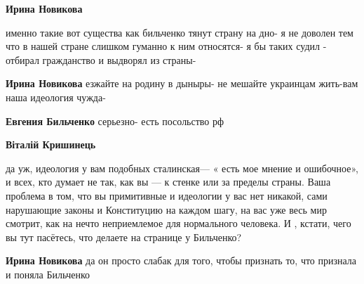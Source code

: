 \begin{itemize}
\begin{itemize}
 
\textbf{Ирина Новикова} 

именно такие вот существа как бильченко тянут страну на дно- я не доволен тем
что в нашей стране слишком гуманно к ним относятся- я бы таких судил - отбирал
гражданство и выдворял из страны-

 
\textbf{Ирина Новикова} езжайте на родину в дыныры- не мешайте украинцам жить-вам наша идеология чужда-

 
\textbf{Евгения Бильченко} серьезно- есть посольство рф

 
\textbf{Віталій Кришинець} 

да уж, идеология у вам подобных сталинская— « есть мое мнение и ошибочное», и
всех, кто думает не так, как вы — к стенке или за пределы страны. Ваша проблема
в том, что вы примитивные и идеологии у вас нет никакой, сами нарушающие законы
и Конституцию на каждом шагу, на вас уже весь мир смотрит, как на нечто
неприемлемое для нормального человека. И , кстати, чего вы тут пасётесь, что
делаете на странице у Бильченко?

 
\textbf{Ирина Новикова} да он просто слабак для того, чтобы признать то, что признала и поняла Бильченко


\end{itemize}
\end{itemize}
